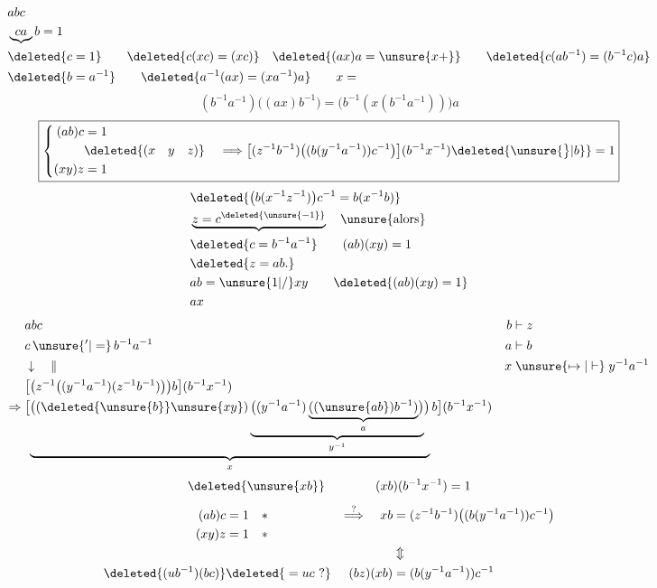 \[
\begin{aligned}
&abc\\
&\underbrace{ca}b=1\\
&\deleted{c=1}\qquad \deleted{c(xc)=(xc)}\quad\deleted{(ax)a=\unsure{x+}} \qquad \deleted{c(ab^{-1})=(b^{-1}c)a}\\
&\deleted{b=a^{-1}}\qquad\deleted{a^{-1}(ax)=(xa^{-1})a}\qquad x=
\end{aligned}
\]
\[
\boxed{(b^{-1}a^{-1})\bigl((ax)b^{-1}\bigr)
=\bigl(b^{-1}(x(b^{-1}a^{-1}))\bigr)a}
\]
\[
\boxed{\left\{\begin{aligned}
(ab)c&=1\\
&\deleted{(x\quad y\quad z)}\\
(xy)z&=1
\end{aligned}\right.\quad\Longrightarrow
\bigl[(z^{-1}b^{-1})\bigl((b(y^{-1}a^{-1}))c^{-1}\bigr)\bigr](b^{-1}x^{-1})\deleted{\unsure{\big\}|b}}=1}
\]
\[
\begin{aligned}
&\deleted{\bigl(b(x^{-1}z^{-1})\bigr)c^{-1}=b(x^{-1}b)}\\
&\underbrace{z=c^{\deleted{\unsure{-1}}}}\quad\unsure{\text{alors}}\\
&\deleted{c=b^{-1}a^{-1}}\qquad(ab)(xy)=1\\
&\deleted{z=ab.}\\
&ab=\unsure{1|/}xy\qquad\deleted{(ab)(xy)=1}\\
&ax
\end{aligned}
\]
\[
\begin{aligned}
&abc&b&\mathrel{\vdash}z\\
&c\,\unsure{{}^{\prime}|=}\,b^{-1}a^{-1}&a&\mathrel{\vdash}b\\
&\downarrow\quad\|&x&\mathrel{\unsure{\mapsto|\vdash}}y^{-1}a^{-1}\\
&\bigl[\bigl(z^{-1}\bigl((y^{-1}a^{-1})(z^{-1}b^{-1})\bigr)\bigr)b\bigr](b^{-1}x^{-1})\\
\Rightarrow{}&
\bigl[\underbrace{\bigl((\deleted{\unsure{b}}\unsure{xy})\underbrace{\bigl((y^{-1}a^{-1})\underbrace{((\unsure{ab})b^{-1})}_{a}\bigr)}_{y^{-1}}\bigr)}_{x}b\bigr](b^{-1}x^{-1})
\end{aligned}
\]
\[
\deleted{\unsure{xb}}\qquad\qquad(xb)(b^{-1}x^{-1})=1
\]
\[
\begin{aligned}
(ab)c&=1\quad *&\overset{?}{\Longrightarrow}\quad xb&=(z^{-1}b^{-1})\bigl((b(y^{-1}a^{-1}))c^{-1}\bigr)\\
(xy)z&=1\quad *&&\\
&&&\Updownarrow\\
\deleted{(ub^{-1})(bc)}&\deleted{{}=uc\ ?}&(bz)(xb)&=(b(y^{-1}a^{-1}))c^{-1}
\end{aligned}
\]
